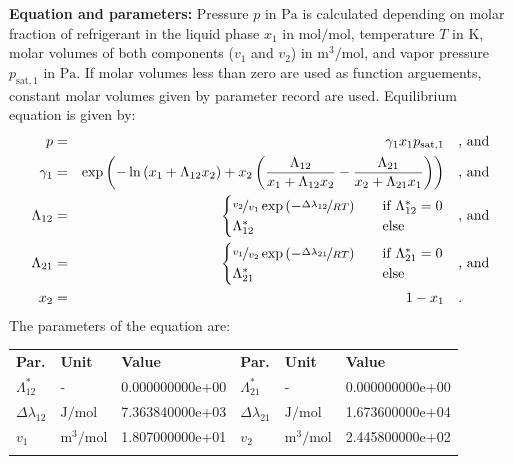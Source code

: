 \textbf{Equation and parameters:}
\newline
%
Pressure $p$ in $\si{\pascal}$ is calculated depending on molar fraction of refrigerant in the liquid phase $x_1$ in $\si{\mole\per\mole}$, temperature $T$ in $\si{\kelvin}$, molar volumes of both components ($v_1$ and $v_2$) in $\si{\cubic\meter\per\mole}$, and vapor pressure $p_\mathrm{sat,1}$ in $\si{\pascal}$. If molar volumes less than zero are used as function arguements, constant molar volumes given by parameter record are used. Equilibrium equation is given by:
%
\begin{equation*}
\begin{split}
p &=& \gamma_1 x_1 p_\mathrm{sat,1} & \quad\text{, and} \\
\gamma_1 &=& \exp \left( - \ln \left( x_1 + \Lambda_{12} x_2 \right) + x_2 \left( \frac{\Lambda_{12}}{x_1 + \Lambda_{12} x_2} - \frac{\Lambda_{21}}{x_2 + \Lambda_{21} x_1} \right) \right) & \quad\text{, and} \\
\Lambda_{12} &=& \begin{cases} \nicefrac{v_2}{v_1} \exp \left( - \nicefrac{\Delta\lambda_{12}}{R T} \right) & \quad \text{if } \Lambda_{12}^{*} = 0 \\ \Lambda_{12}^{*}  & \quad \text{else} \end{cases}  & \quad\text{, and} \\
\Lambda_{21} &=& \begin{cases} \nicefrac{v_1}{v_2} \exp \left( - \nicefrac{\Delta\lambda_{21}}{R T} \right) & \quad \text{if } \Lambda_{21}^{*} = 0 \\ \Lambda_{21}^{*}  & \quad \text{else} \end{cases}  & \quad\text{, and} \\
x_2 &=& 1 - x_1  & \quad\text{.} \\
\end{split}
\end{equation*}
%
The parameters of the equation are:
%
\begin{longtable}[l]{lll|lll}
\toprule
\addlinespace
\textbf{Par.} & \textbf{Unit} & \textbf{Value} &	\textbf{Par.} & \textbf{Unit} & \textbf{Value} \\
\addlinespace
\midrule
\endhead

\bottomrule
\endfoot
\bottomrule
\endlastfoot
\addlinespace

$\Lambda_{12}^{*}$ & - & 0.000000000e+00 & $\Lambda_{21}^{*}$ & - & 0.000000000e+00 \\
$\Delta\lambda_{12}$ & $\si{\joule\per\mole}$ & 7.363840000e+03 & $\Delta\lambda_{21}$ & $\si{\joule\per\mole}$ & 1.673600000e+04 \\
$v_1$ & $\si{\cubic\meter\per\mole}$ & 1.807000000e+01 & $v_2$ & $\si{\cubic\meter\per\mole}$ & 2.445800000e+02 \\

\addlinespace\end{longtable}

